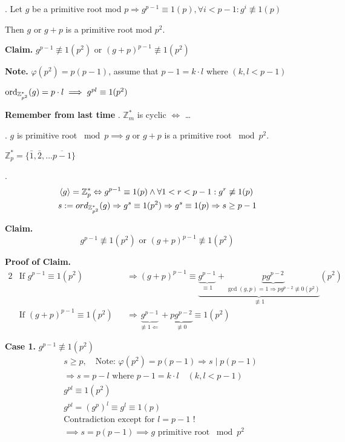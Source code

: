 \Proof.
Let $g$ be a primitive root mod $p \Rightarrow g^{p-1} \equiv 1 (p), \forall i < p-1 : g^i \not\equiv 1 (p) $

Then $g$ or $g+p$ is a primitive root mod $p^2$.

\textbf{Claim.}
$g^{p-1} \not\equiv 1 (p^2)$ or $(g+p)^{p-1} \not\equiv 1 (p^2)$

\textbf{Note.}
$\varphi(p^2) = p(p-1)$, assume that $p-1 = k \cdot l$ where $(k, l < p-1)$

$\operatorname{ord}_{\mathbb{Z}^{*}_{p^2}}(g) = p \cdot l \implies g^{pl} \equiv 1 (p^2)$

\textbf{Remember from last time}
\Theorem. $\mathbb{Z}_m^{*}$ is cyclic $\Leftrightarrow$ \dots

\Lemma. $g$ is primitive root $\bmod p \implies g$ or $g+p$ is a primitive root $\bmod{p^2}$.

\begin{leftbar}
  $\mathbb{Z}_p^{*} = \{\bar{1}, \bar{2}, \ldots \overline{p-1}\}$
\end{leftbar}
\Proof.
\begin{align*}
  &\left\langle g \right\rangle = \mathbb{Z}_p^{*} \Leftrightarrow g^{p-1} \equiv 1 (p) \land \forall 1 < r < p-1 : g^r \not\equiv 1(p) \\
  &s : = ord_{\mathbb{Z}_{p^2}^{*}} (g) \Rightarrow g^s \equiv 1 (p^2) \Rightarrow g^s \equiv 1 (p) \Rightarrow s \geq p-1
\end{align*}

\textbf{Claim.}
\[
  g^{p-1} \not\equiv 1 (p^2) \text{ or } (g+p)^{p-1} \not\equiv 1(p^2)
\]

\textbf{Proof of Claim.}
\begin{alignat*}{2}
  &\text{If } g^{p-1} \equiv 1(p^2)
  &&\Rightarrow (g+p)^{p-1} \equiv \underbrace{\underbrace{g^{p-1}}_{\equiv 1} + \underbrace{pg^{p-2}}_{\gcd(g,p) = 1 \Rightarrow pg^{p-2}\not\equiv 0 (p^2)}}_{\not\equiv 1} (p^2)\\
  &\text{If } (g+p)^{p-1} \equiv 1(p^2)
  &&\Rightarrow \underbrace{g^{p-1}}_{\not\equiv 1\Leftarrow} + \underbrace{pg^{p-2}}_{\not\equiv 0} \equiv 1 (p^2)
\end{alignat*}

\textbf{Case 1.} $g^{p-1} \not\equiv 1 (p^2)$
\begin{align*}
  &s \geq p, \quad\text{Note: } \varphi(p^2) = p(p-1) \Rightarrow s \mid p(p-1) \\
  &\Rightarrow s = p-l \text{ where } p-1 = k\cdot l \quad (k,l < p-1) \\
  &g^{pl} \equiv 1 (p^2) \\
  &g^{pl} = (g^p)^l \equiv g^l \equiv 1 (p) \\
  &\text{Contradiction except for } l = p-1 \text{ !}\\
  &\implies s = p(p-1) \implies g \text{ primitive root } \bmod p^2
\end{align*}

